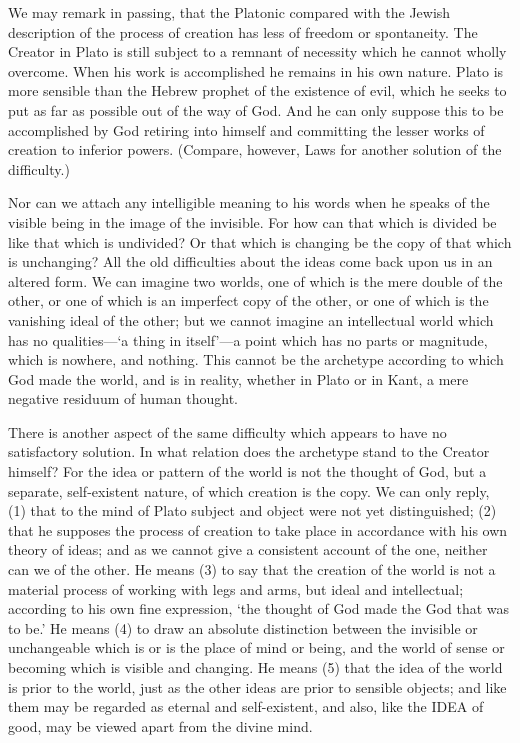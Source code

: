 \documentclass[11pt,letter]{article}
\begin{document}
\par  We may remark in passing, that the Platonic compared with the Jewish description of the process of creation has less of freedom or spontaneity. The Creator in Plato is still subject to a remnant of necessity which he cannot wholly overcome. When his work is accomplished he remains in his own nature. Plato is more sensible than the Hebrew prophet of the existence of evil, which he seeks to put as far as possible out of the way of God. And he can only suppose this to be accomplished by God retiring into himself and committing the lesser works of creation to inferior powers. (Compare, however, Laws for another solution of the difficulty.)

\par  Nor can we attach any intelligible meaning to his words when he speaks of the visible being in the image of the invisible. For how can that which is divided be like that which is undivided? Or that which is changing be the copy of that which is unchanging? All the old difficulties about the ideas come back upon us in an altered form. We can imagine two worlds, one of which is the mere double of the other, or one of which is an imperfect copy of the other, or one of which is the vanishing ideal of the other; but we cannot imagine an intellectual world which has no qualities—‘a thing in itself’—a point which has no parts or magnitude, which is nowhere, and nothing. This cannot be the archetype according to which God made the world, and is in reality, whether in Plato or in Kant, a mere negative residuum of human thought.

\par  There is another aspect of the same difficulty which appears to have no satisfactory solution. In what relation does the archetype stand to the Creator himself? For the idea or pattern of the world is not the thought of God, but a separate, self-existent nature, of which creation is the copy. We can only reply, (1) that to the mind of Plato subject and object were not yet distinguished; (2) that he supposes the process of creation to take place in accordance with his own theory of ideas; and as we cannot give a consistent account of the one, neither can we of the other. He means (3) to say that the creation of the world is not a material process of working with legs and arms, but ideal and intellectual; according to his own fine expression, ‘the thought of God made the God that was to be.’ He means (4) to draw an absolute distinction between the invisible or unchangeable which is or is the place of mind or being, and the world of sense or becoming which is visible and changing. He means (5) that the idea of the world is prior to the world, just as the other ideas are prior to sensible objects; and like them may be regarded as eternal and self-existent, and also, like the IDEA of good, may be viewed apart from the divine mind.
\end{document}
